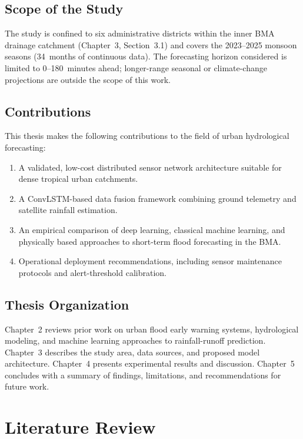 \documentclass[12pt,a4paper]{report}
\begin{document}
\section{Scope of the Study}
The study is confined to six administrative districts within the inner BMA drainage catchment (Chapter~3, Section~3.1) and covers the 2023--2025 monsoon seasons (34~months of continuous data). The forecasting horizon considered is limited to 0--180~minutes ahead; longer-range seasonal or climate-change projections are outside the scope of this work.

\section{Contributions}
This thesis makes the following contributions to the field of urban hydrological forecasting:

\begin{enumerate}[leftmargin=1.6em]
  \item A validated, low-cost distributed sensor network architecture suitable for dense tropical urban catchments.
  \item A ConvLSTM-based data fusion framework combining ground telemetry and satellite rainfall estimation.
  \item An empirical comparison of deep learning, classical machine learning, and physically based approaches to short-term flood forecasting in the BMA.
  \item Operational deployment recommendations, including sensor maintenance protocols and alert-threshold calibration.
\end{enumerate}

\section{Thesis Organization}
Chapter~2 reviews prior work on urban flood early warning systems, hydrological modeling, and machine learning approaches to rainfall-runoff prediction. Chapter~3 describes the study area, data sources, and proposed model architecture. Chapter~4 presents experimental results and discussion. Chapter~5 concludes with a summary of findings, limitations, and recommendations for future work.

\chapter{Literature Review}
\end{document}
